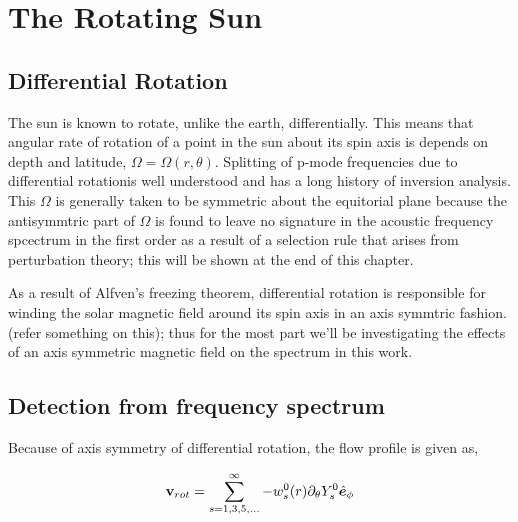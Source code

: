 
\chapter{The Rotating Sun}

\section{Differential Rotation}
The sun is known to rotate, unlike the earth, differentially. This means that angular rate of rotation of a point in the sun about its spin axis is depends on depth and latitude, $\Omega = \Omega(r,\theta)$. Splitting of p-mode frequencies due to differential rotationis well understood\cite{ritzwoller} and has a long history of inversion analysis\cite{schou98}.
This $\Omega$ is generally taken to be symmetric about the equitorial plane because the antisymmtric part of $\Omega$ is found to leave no signature in the acoustic frequency spcectrum in the first order as a result of a selection rule that arises from perturbation theory; this will be shown at the end of this chapter.

As a result of Alfven's freezing theorem, differential rotation is responsible for winding the solar magnetic field around its spin axis in an axis symmtric fashion. (refer something on this); thus for the most part we'll be investigating the effects of an axis symmetric magnetic field on the spectrum in this work.

\section{Detection from frequency spectrum}

Because of axis symmetry of differential rotation, the flow profile is given as,

\begin{equation}
\mathbf{v}_{rot} = \sum_{s = 1,3,5,...}^{\infty} -w_s^0(r) \partial_{\theta} Y_s^0 \hat{\bm{e}}_{\phi}
\end{equation}

